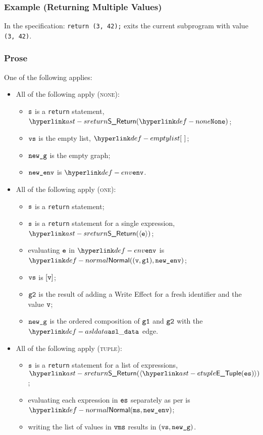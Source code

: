 \subsubsection{Example (Returning Multiple Values)}
In the specification:
\texttt{return (3, 42);} exits the current subprogram with value \texttt{(3, 42)}.

\subsubsection{Prose}
One of the following applies:
\begin{itemize}
  \item All of the following apply (\textsc{none}):
  \begin{itemize}
    \item $\texttt{s}$ is a \texttt{return} statement, $\SReturn(\None)$;
    \item $\texttt{vs}$ is the empty list, $\emptylist$;
    \item $\texttt{new\_g}$ is the empty graph;
    \item $\texttt{new\_env}$ is $\env$.
  \end{itemize}

  \item All of the following apply (\textsc{one}):
  \begin{itemize}
    \item $\texttt{s}$ is a \texttt{return} statement;
    \item $\texttt{s}$ is a \texttt{return} statement for a single expression, $\SReturn(\langle\ve\rangle)$;
    \item evaluating $\texttt{e}$ in $\env$ is $\Normal((\vv, \vgone), \newenv)$\ProseOrAbnormal;
    \item $\texttt{vs}$ is $[\texttt{v}]$;
    \item $\texttt{g2}$ is the result of adding a Write Effect for a fresh identifier and the value $\texttt{v}$;
    \item $\texttt{new\_g}$ is the ordered composition of $\texttt{g1}$ and $\texttt{g2}$ with the $\asldata$ edge.
  \end{itemize}

  \item All of the following apply (\textsc{tuple}):
  \begin{itemize}
    \item $\texttt{s}$ is a \texttt{return} statement for a list of expressions, $\SReturn(\langle\ETuple(\es)\rangle)$;
    \item evaluating each expression in $\texttt{es}$ separately as per 
    is \\ $\Normal(\ms, \newenv)$\ProseOrAbnormal;
    \item writing the list of values in $\texttt{vms}$ results in $(\texttt{vs}, \texttt{new\_g})$.
  \end{itemize}
\end{itemize}

